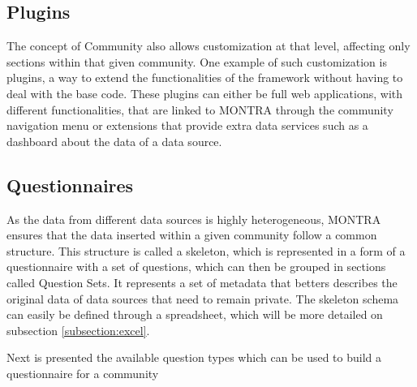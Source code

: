 \subsection*{Plugins}
The concept of Community also allows customization at that level, affecting only sections within that given community.
One example of such customization is plugins, a way to extend the functionalities of the framework without having to deal with the base code.
These plugins can either be full web applications, with different functionalities, that are linked to MONTRA through the community navigation menu or extensions that provide extra data services such as a dashboard about the data of a data source.

\subsection{Questionnaires}


As the data from different data sources is highly heterogeneous, MONTRA ensures that the data inserted within a given community follow a common structure.
This structure is called a skeleton, which is represented in a form of a questionnaire with a set of questions, which can then be grouped in sections called Question Sets.
It represents a set of metadata that betters describes the original data of data sources that need to remain private.
The skeleton schema can easily be defined through a spreadsheet, which will be more detailed on subsection \ref{subsection:excel}.

Next is presented the available question types which can be used to build a questionnaire for a community

